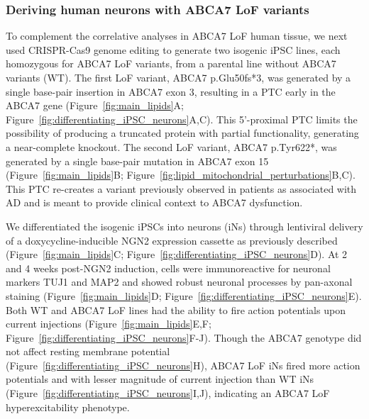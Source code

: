 \subsubsection{Deriving human neurons with ABCA7 LoF variants}
To complement the correlative analyses in ABCA7 LoF human tissue, we next used CRISPR-Cas9 genome editing to generate two isogenic iPSC lines, each homozygous for ABCA7 LoF variants, from a parental line without ABCA7 variants (WT). The first LoF variant, ABCA7 p.Glu50fs*3, was generated by a single base-pair insertion in ABCA7 exon 3, resulting in a PTC early in the ABCA7 gene (Figure~\ref{fig:main_lipids}A; Figure~\ref{fig:differentiating_iPSC_neurons}A,C). This 5’-proximal PTC limits the possibility of producing a truncated protein with partial functionality, generating a near-complete knockout. The second LoF variant, ABCA7 p.Tyr622*, was generated by a single base-pair mutation in ABCA7 exon 15 (Figure~\ref{fig:main_lipids}B; Figure~\ref{fig:lipid_mitochondrial_perturbations}B,C). This PTC re-creates a variant previously observed in patients as associated with AD \cite{Steinberg2015-mu} and is meant to provide clinical context to ABCA7 dysfunction. 

We differentiated the isogenic iPSCs into neurons (iNs) through lentiviral delivery of a doxycycline-inducible NGN2 expression cassette as previously described\cite{Ho2016-kz} (Figure~\ref{fig:main_lipids}C; Figure~\ref{fig:differentiating_iPSC_neurons}D). At 2 and 4 weeks post-NGN2 induction, cells were immunoreactive for neuronal markers TUJ1 and MAP2 and showed robust neuronal processes by pan-axonal staining (Figure~\ref{fig:main_lipids}D; Figure~\ref{fig:differentiating_iPSC_neurons}E). Both WT and ABCA7 LoF lines had the ability to fire action potentials upon current injections (Figure~\ref{fig:main_lipids}E,F; Figure~\ref{fig:differentiating_iPSC_neurons}F-J). Though the ABCA7 genotype did not affect resting membrane potential (Figure~\ref{fig:differentiating_iPSC_neurons}H), ABCA7 LoF iNs fired more action potentials and with lesser magnitude of current injection than WT iNs (Figure~\ref{fig:differentiating_iPSC_neurons}I,J), indicating an ABCA7 LoF hyperexcitability phenotype. 

